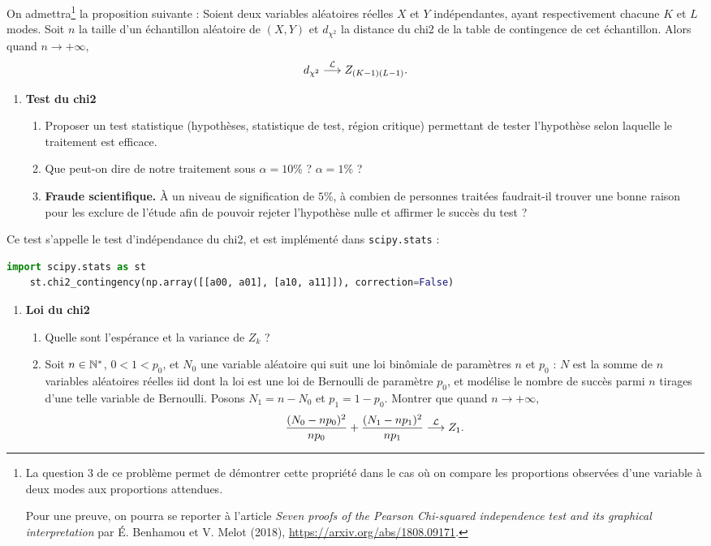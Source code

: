 \documentclass[french,11pt]{article}
\begin{document}
On admettra\footnote{La question 3 de ce problème permet de démontrer
cette propriété dans le cas où on compare les proportions observées d'une
variable à deux modes aux proportions attendues.

Pour une preuve, on pourra se reporter à l'article \textit{Seven proofs of the
  Pearson Chi-squared independence test and its graphical interpretation} par
É. Benhamou et V. Melot (2018),
\href{https://arxiv.org/abs/1808.09171}{https://arxiv.org/abs/1808.09171}.  }
la proposition suivante : Soient deux variables aléatoires réelles $X$ et $Y$
indépendantes, ayant respectivement chacune $K$ et $L$ modes. Soit $n$ la
taille d'un échantillon aléatoire de $(X, Y)$ et $d_{\chi^2}$ la distance du
chi2 de la table de contingence de cet échantillon. Alors quand
$n \rightarrow +\infty,$
\[
  d_{\chi^2} \stackrel{\mathcal{L}}{\longrightarrow} Z_{(K-1)(L-1)}.
\]


\begin{enumerate}[resume]
\item \textbf{Test du chi2}
  \begin{enumerate}
  \item Proposer un test statistique (hypothèses, statistique de test, région
    critique) permettant de tester l'hypothèse selon laquelle le traitement est
    efficace.
  \item Que peut-on dire de notre traitement sous $\alpha = 10\%$ ? $\alpha = 1\%$ ?
  \item \textbf{Fraude scientifique.} À un niveau de
    signification de $5\%$, à combien de personnes traitées faudrait-il trouver
    une bonne raison pour les exclure de l'étude afin de pouvoir rejeter l'hypothèse
    nulle et affirmer le succès du test ?
  \end{enumerate}
\end{enumerate}

Ce test s'appelle le test d'indépendance du chi2, et est implémenté dans \texttt{scipy.stats} :

  \begin{lstlisting}[language=Python]
    import scipy.stats as st
    st.chi2_contingency(np.array([[a00, a01], [a10, a11]]), correction=False)
  \end{lstlisting}
  
\begin{enumerate}[resume]
\item \textbf{Loi du chi2} \\
  \begin{enumerate}
  \item Quelle sont l'espérance et la variance de $Z_k$ ? 
  \item Soit $n \in \mathbb{N}^*$, $0 < 1 < p_0$, et $N_0$ une variable aléatoire qui
    suit une loi binômiale de paramètres $n$ et $p_0$ : $N$ est la somme de $n$
    variables aléatoires réelles iid dont la loi est une loi de Bernoulli de
    paramètre $p_0$, et modélise le nombre de succès parmi $n$ tirages d'une
    telle variable de Bernoulli. Posons $N_1 = n - N_0$ et $p_1 = 1 -
    p_0$. Montrer que quand $n \rightarrow +\infty,$ 
    \[
      \frac{(N_0 - n p_0)^2}{n p_0}  + \frac{(N_1 - n p_1)^2}{n p_1} \stackrel{\mathcal{L}}{\longrightarrow} Z_1.
    \]
  \end{enumerate}
\end{enumerate}
\end{document}
